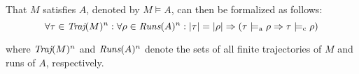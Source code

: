 That $M$ satisfies $A$, denoted by $M \models A$, can then be formalized as follows: %
%
\begin{equation*}
\forall \tau \in \operatorname{\textit{Traj}}(M)^{n} : \forall \rho \in \operatorname{\textit{Runs}}(A)^{n} : | \tau | = | \rho | \Rightarrow (\tau \models_{\textrm{a}} \rho \Rightarrow \tau \models_{\textrm{c}} \rho)
\end{equation*}

\noindent where $\operatorname{\textit{Traj}}(M)^{n}$ and $\operatorname{\textit{Runs}}(A)^{n}$ denote the sets of all finite trajectories of $M$ and runs of $A$, respectively. 






